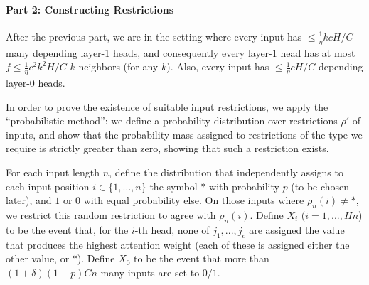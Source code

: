 \documentclass[11pt,a4paper]{article}
\begin{document}
\paragraph{Part 2: Constructing Restrictions}
After the previous part, we are in the setting where every input has $\leq \frac{1}{\eta}kcH/C$ many depending layer-1 heads, and consequently every layer-1 head has at most $f \leq \frac{1}{\eta}c^2k^2H/C$ $k$-neighbors (for any $k$).
Also, every input has $\leq \frac{1}{\eta}cH/C$ depending layer-0 heads.


In order to prove the existence of suitable input restrictions, we apply the ``probabilistic method'': we define a probability distribution over restrictions $\rho'$ of inputs, and show that the probability mass assigned to restrictions of the type we require is strictly greater than zero, showing that such a restriction exists.

For each input length $n$, define the distribution that independently assigns to each input position $i \in \{1, \dots, n\}$ the symbol $*$ with probability $p$ (to be chosen later), and $1$ or $0$ with equal probability else.
On those inputs where $\rho_n(i) \neq *$, we restrict this random restriction to agree with $\rho_n(i)$.
Define $X_i$ ($i=1, ..., H n$) to be the event that, for the $i$-th head, none of $j_1, ..., j_c$ are assigned the value that produces the highest attention weight (each of these is assigned either the other value, or $*$).
Define $X_0$ to be the event that more than $(1+\delta)(1-p)Cn$ many inputs are set to $0/1$.
\end{document}
